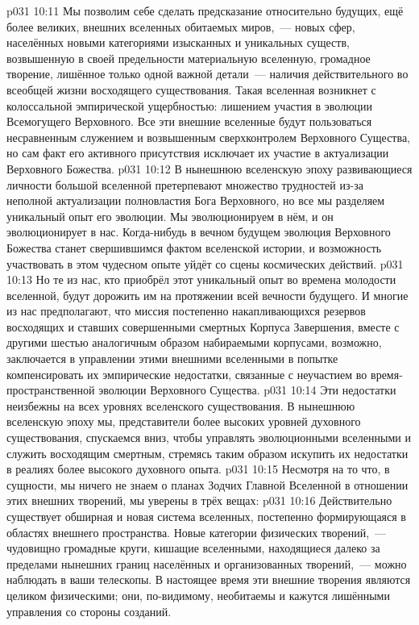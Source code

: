 \vs p031 10:11 Мы позволим себе сделать предсказание относительно будущих, ещё более великих, внешних вселенных обитаемых миров,~--- новых сфер, населённых новыми категориями изысканных и уникальных существ, возвышенную в своей предельности материальную вселенную, громадное творение, лишённое только одной важной детали~--- наличия действительного  во всеобщей жизни восходящего существования. Такая вселенная возникнет с колоссальной эмпирической ущербностью: лишением участия в эволюции Всемогущего Верховного. Все эти внешние вселенные будут пользоваться несравненным служением и возвышенным сверхконтролем Верховного Существа, но сам факт его активного присутствия исключает их участие в актуализации Верховного Божества.
\vs p031 10:12 В нынешнюю вселенскую эпоху развивающиеся личности большой вселенной претерпевают множество трудностей из\hyp{}за неполной актуализации полновластия Бога Верховного, но все мы разделяем уникальный опыт его эволюции. Мы эволюционируем в нём, и он эволюционирует в нас. Когда\hyp{}нибудь в вечном будущем эволюция Верховного Божества станет свершившимся фактом вселенской истории, и возможность участвовать в этом чудесном опыте уйдёт со сцены космических действий.
\vs p031 10:13 Но те из нас, кто приобрёл этот уникальный опыт во времена молодости вселенной, будут дорожить им на протяжении всей вечности будущего. И многие из нас предполагают, что миссия постепенно накапливающихся резервов восходящих и ставших совершенными смертных Корпуса Завершения, вместе с другими шестью аналогичным образом набираемыми корпусами, возможно, заключается в управлении этими внешними вселенными в попытке компенсировать их эмпирические недостатки, связанные с неучастием во время\hyp{}пространственной эволюции Верховного Существа.
\vs p031 10:14 Эти недостатки неизбежны на всех уровнях вселенского существования. В нынешнюю вселенскую эпоху мы, представители более высоких уровней духовного существования, спускаемся вниз, чтобы управлять эволюционными вселенными и служить восходящим смертным, стремясь таким образом искупить их недостатки в реалиях более высокого духовного опыта.
\vs p031 10:15 Несмотря на то что, в сущности, мы ничего не знаем о планах Зодчих Главной Вселенной в отношении этих внешних творений, мы уверены в трёх вещах:
\vs p031 10:16 Действительно существует обширная и новая система вселенных, постепенно формирующаяся в областях внешнего пространства. Новые категории физических творений,~--- чудовищно громадные круги, кишащие вселенными, находящиеся далеко за пределами нынешних границ населённых и организованных творений,~--- можно наблюдать в ваши телескопы. В настоящее время эти внешние творения являются целиком физическими; они, по\hyp{}видимому, необитаемы и кажутся лишёнными управления со стороны созданий.

